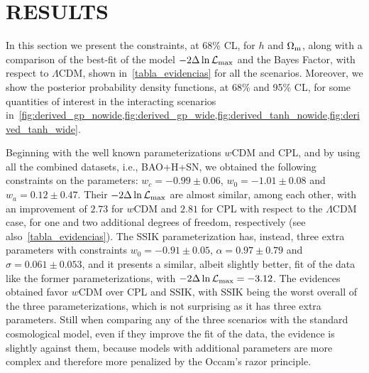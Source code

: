 \documentclass[twocolumn,a4paper,reprint,amssymb,aps,prd,groupedaddress,superscriptaddress,nofootinbib]{revtex4-2}
\begin{document}
\section{RESULTS}\label{section:results}

In this section we present the constraints, at 68\% CL, for $h$ and $\Omega_{\rm m}$, along with a
comparison of the best-fit of the model $-2\Delta \ln \mathcal{L_{\rm max}}$ and the Bayes Factor, with
respect to $\Lambda$CDM, shown in~\cref{tabla_evidencias} for all the scenarios.
Moreover, we show the posterior probability density functions, at 68\% and 95\% CL, for some quantities
of interest in the interacting scenarios in~\cref{fig:derived_gp_nowide,fig:derived_gp_wide,fig:derived_tanh_nowide,fig:derived_tanh_wide}.

Beginning with the well known parameterizations $w$CDM and CPL, and by using all the combined
datasets, i.e., BAO+H+SN, we obtained the following constraints on the parameters:
$w_c=-0.99\pm0.06$, $w_0=-1.01\pm0.08$ and $w_a=0.12\pm0.47$. Their
$-2\Delta\ln \mathcal{L_{\rm max}}$ are almost similar, among each other, with an improvement of
$2.73$ for $w$CDM and $2.81$ for CPL with respect to the $\Lambda$CDM case, for one and two additional
degrees of freedom, respectively (see also~\cref{tabla_evidencias}).
The SSIK parameterization has, instead, three extra parameters with constraints $w_0=-0.91 \pm 0.05$,
$\alpha = 0.97 \pm 0.79$ and $\sigma = 0.061 \pm 0.053$, and it presents a similar, albeit slightly
better, fit of the data like the former parameterizations, with $-2\Delta\ln \mathcal{L_{\rm max}} = -3.12$.
The evidences obtained favor $w$CDM over CPL and SSIK, with SSIK being the worst overall of the three
parameterizations, which is not surprising as it has three extra parameters. Still when comparing any
of the three scenarios with the standard cosmological model, even if they improve the fit of the data,
the evidence is slightly against them, because models with additional parameters are more complex and
therefore more penalized by the Occam's razor principle.
\end{document}
